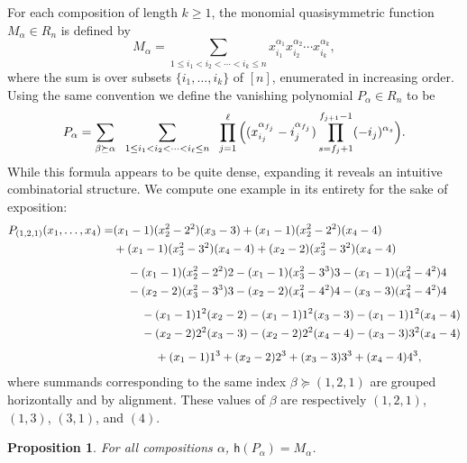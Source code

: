 \documentclass[12pt]{amsart}
\newtheorem{prop}[equation]{Proposition}
\theoremstyle{definition}
\theoremstyle{remark}
\numberwithin{equation}{section}
\begin{document}
For each composition of length $k \ge 1$, the monomial quasisymmetric function $M_{\alpha} \in R_{n}$ is defined by
\[
M_{\alpha} = \sum_{1\le i_1<i_2<\cdots<i_k\le n} x_{i_1}^{\alpha_1} x_{i_2}^{\alpha_2}\cdots  x_{i_k}^{\alpha_k},
\]
where the sum is over subsets $\{i_{1}, \ldots, i_{k}\}$ of $[n]$, enumerated in increasing order.  Using the same convention we define the vanishing polynomial $P_{\alpha} \in R_{n}$ to be
\[
P_{\alpha} =  
\sum_{\beta \succeq \alpha}
\hspace{0.6em}
\sum_{1\le i_{1} < i_{2} < \cdots < i_{\ell} \le n} 
\hspace{0.6em}
\prod_{j = 1}^{\ell}
\Big(
(x_{i_{j}}^{\alpha_{f_{j}}} - i_{j}^{\alpha_{f_{j}}}) 
\prod_{s = f_{j} + 1}^{f_{j+1} - 1} (- i_{j})^{\alpha_{s}}
\Big).
\]
While this formula appears to be quite dense, expanding it reveals an intuitive combinatorial structure.  We compute one example in its entirety for the sake of exposition: 
\begin{align*}
P_{(1, 2, 1)}(x_{1}, \ldots, x_{4}) =& (x_{1} - 1)(x_{2}^{2} - 2^{2})(x_{3} - 3) + (x_{1} - 1)(x_{2}^{2} - 2^{2})(x_{4} - 4) \\
&+ (x_{1} - 1)(x_{3}^{2} - 3^{2})(x_{4} - 4) + (x_{2} - 2)(x_{3}^{2} - 3^{2})(x_{4} - 4) \\[1ex]
&\hspace{1.2em} -  (x_{1} - 1)(x_{2}^{2} - 2^{2})2 -  (x_{1} - 1)(x_{3}^{2} - 3^{3})3 -  (x_{1} - 1)(x_{4}^{2} - 4^{2})4  \\
&\hspace{1.2em} -  (x_{2} - 2)(x_{3}^{2} - 3^{3})3 -  (x_{2} - 2)(x_{4}^{2} - 4^{2})4 -  (x_{3} - 3)(x_{4}^{2} - 4^{2})4 \\[1ex]
&\hspace{2.4em} -  (x_{1} - 1)1^{2}(x_{2} - 2) -  (x_{1} - 1)1^{2}(x_{3} - 3) -  (x_{1} - 1)1^{2}(x_{4} - 4) \\
&\hspace{2.4em} -  (x_{2} - 2)2^{2}(x_{3} - 3) -  (x_{2} - 2)2^{2}(x_{4} - 4) -  (x_{3} - 3)3^{2}(x_{4} - 4) \\[1ex]
&\hspace{3.6em} + (x_{1} - 1) 1^{3} + (x_{2} - 2) 2^{3} + (x_{3} - 3) 3^{3} + (x_{4} - 4) 4^{3},
\end{align*}
where summands corresponding to the same index $\beta \succeq (1, 2, 1)$ are grouped horizontally and by alignment.  These values of $\beta$ are respectively $(1, 2, 1)$, $(1, 3)$, $(3, 1)$, and $(4)$.

\begin{prop}
For all compositions $\alpha$, $\mathsf{h}(P_{\alpha}) = M_{\alpha}$.
\end{prop}
\end{document}
